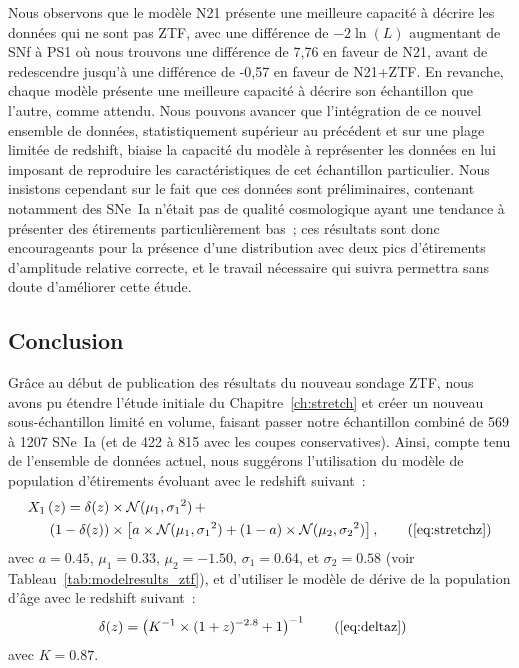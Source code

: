 \documentclass[../main/main.tex]{subfiles}
\begin{document}
Nous observons que le modèle N21 présente une meilleure capacité à décrire les
données qui ne sont pas ZTF, avec une différence de $-2\ln(L)$ augmentant de SNf
à PS1 où nous trouvons une différence de 7,76 en faveur de N21, avant de
redescendre jusqu'à une différence de -0,57 en faveur de N21+ZTF. En revanche,
chaque modèle présente une meilleure capacité à décrire son échantillon que
l'autre, comme attendu. Nous pouvons avancer que l'intégration de ce nouvel
ensemble de données, statistiquement supérieur au précédent et sur une plage
limitée de redshift, biaise la capacité du modèle à représenter les données en
lui imposant de reproduire les caractéristiques de cet échantillon particulier.
Nous insistons cependant sur le fait que ces données sont préliminaires,
contenant notamment des SNe~Ia n'était pas de qualité cosmologique ayant une
tendance à présenter des étirements particulièrement bas~; ces résultats sont
donc encourageants pour la présence d'une distribution avec deux pics
d'étirements d'amplitude relative correcte, et le travail nécessaire qui suivra
permettra sans doute d'améliorer cette étude.

\subsection{Conclusion}\label{ssec:ztfconc}

Grâce au début de publication des résultats du nouveau sondage ZTF, nous avons
pu étendre l'étude initiale du Chapitre~\ref{ch:stretch} et créer un nouveau
sous-échantillon limité en volume, faisant passer notre échantillon combiné de
569 à 1207 SNe~Ia (et de 422 à 815 avec les coupes conservatives). Ainsi, compte
tenu de l'ensemble de données actuel, nous suggérons l'utilisation du modèle de
population d'étirements évoluant avec le redshift suivant~:
\begin{align*}\label{eqconclusion:stretchz}
    X_1\left(z \right) =
        \delta(z)&\times\mathcal{N}(\mu_1,\sigma_1{}^2)\,+\nonumber\\
        (1-\delta(z))&\times \left[a\times\mathcal{N}(\mu_1,\sigma_1{}^2) +
        (1-a)\times\mathcal{N}(\mu_2,\sigma_2{}^2)\right],
    \tag{\ref{eq:stretchz}}
\end{align*}
avec $a=0.45$, $\mu_1=0.33$, $\mu_2=-1.50$, $\sigma_1=0.64$, et $\sigma_2=0.58$
(voir Tableau~\ref{tab:modelresults_ztf}), et d'utiliser le modèle de dérive
de la population d'âge avec le redshift suivant~:
\begin{align*}
    \delta(z) & = \left( K^{-1} \times (1+z)^{-2.8} +1 \right)^{-1}
    \tag{\ref{eq:deltaz}}
\end{align*}
avec $K=0.87$.
\end{document}
